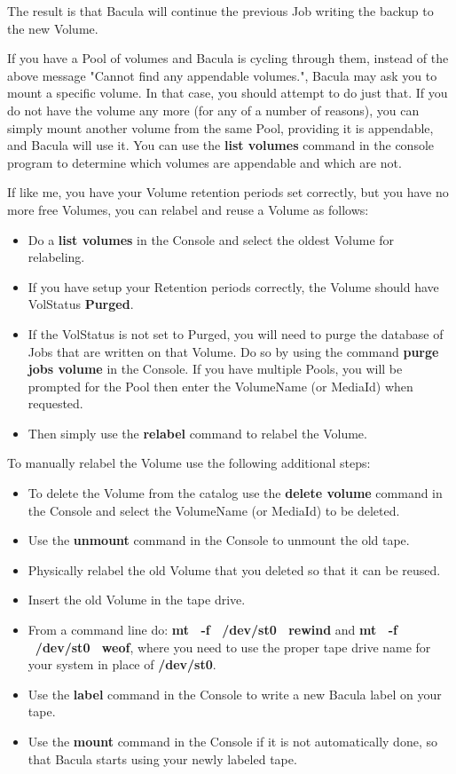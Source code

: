 The result is that Bacula will continue the previous Job writing the backup to
the new Volume. 

If you have a Pool of volumes and Bacula is cycling through them, instead of
the above message "Cannot find any appendable volumes.", Bacula may ask you
to mount a specific volume. In that case, you should attempt to do just that.
If you do not have the volume any more (for any of a number of reasons), you
can simply mount another volume from the same Pool, providing it is
appendable, and Bacula will use it. You can use the {\bf list volumes} command
in the console program to determine which volumes are appendable and which are
not. 

If like me, you have your Volume retention periods set correctly, but you have
no more free Volumes, you can relabel and reuse a Volume as follows: 

\begin{itemize}
\item Do a {\bf list volumes} in the Console and select the oldest  Volume for
   relabeling.  
\item If you have setup your Retention periods correctly, the  Volume should
   have VolStatus {\bf Purged}.  
\item If the VolStatus is not set to Purged, you will need to purge  the
   database of Jobs that are written on that Volume. Do so  by using the command
   {\bf purge jobs volume} in the Console.  If you have multiple Pools, you will
be prompted for the  Pool then enter the VolumeName (or MediaId) when
requested.  
\item Then simply use the {\bf relabel} command to relabel the  Volume. 
   \end{itemize}

To manually relabel the Volume use the following additional steps: 

\begin{itemize}
\item To delete the Volume from the catalog use the {\bf delete volume} 
   command in the Console and select the VolumeName (or MediaId) to be  deleted. 

\item Use the {\bf unmount} command in the Console to unmount the  old tape.  
\item Physically relabel the old Volume that you deleted so that it  can be
   reused.  
\item Insert the old Volume in the tape drive.  
\item From a command line do: {\bf mt \ -f \ /dev/st0 \ rewind} and  {\bf mt \
   -f \ /dev/st0 \ weof}, where you need to use the proper  tape drive name for
   your system in place of {\bf /dev/st0}.  
\item Use the {\bf label} command in the Console to write a new  Bacula label
   on your tape.  
\item Use the {\bf mount} command in the Console if it is not automatically 
   done, so that Bacula starts using your newly labeled tape. 
   \end{itemize}

